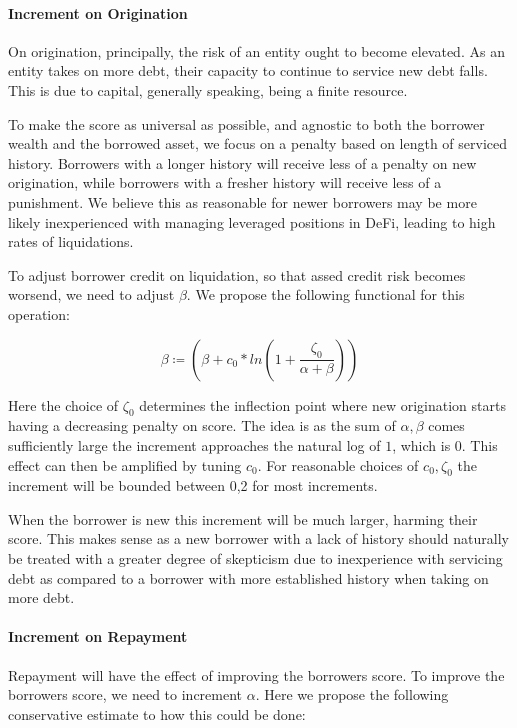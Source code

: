 \documentclass{article}
\begin{document}
\paragraph{Increment on Origination}

On origination, principally, the risk of an entity ought to become elevated. As an entity takes on more debt, their capacity to continue to service new debt falls. This is due to capital, generally speaking, being a finite resource.

To make the score as universal as possible, and agnostic to both the borrower wealth and the borrowed asset, we focus on a penalty based on length of serviced history. Borrowers with a longer history will receive less of a penalty on new origination, while borrowers with a fresher history will receive less of a punishment. We believe this as reasonable for newer borrowers may be more likely inexperienced with managing leveraged positions in DeFi, leading to high rates of liquidations. 

To adjust borrower credit on liquidation, so that assed credit risk becomes worsend, we need to adjust $\beta$. We propose the following functional for this operation:

\begin{equation}
\beta \coloneqq  (\beta + c_0*ln(1 + \frac{\zeta_0}{\alpha+\beta}))
\end{equation}

Here the choice of $\zeta_0$ determines the inflection point where new origination starts having a decreasing penalty on score. The idea is as the sum of $\alpha, \beta$ comes sufficiently large the increment approaches the natural log of $1$, which is 0. This effect can then be amplified by tuning $c_0$. For reasonable choices of $c_0, \zeta_0$ the increment will be bounded between 0,2 for most increments. 

When the borrower is new this increment will be much larger, harming their score. This makes sense as a new borrower with a lack of history should naturally be treated with a greater degree of skepticism due to inexperience with servicing debt as compared to a borrower with more established history when taking on more debt.

\paragraph{Increment on Repayment}

Repayment will have the effect of improving the borrowers score. To improve the borrowers score, we need to increment $\alpha$. Here we propose the following conservative estimate to how this could be done:
\end{document}
